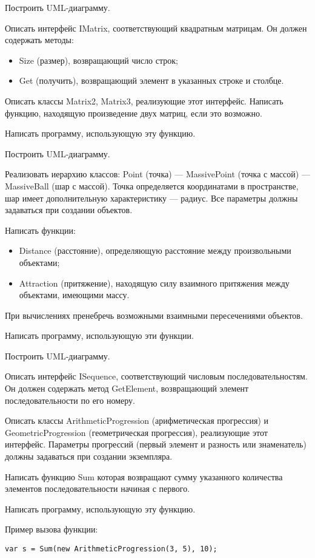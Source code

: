 Построить UML-диаграмму.

\task Описать интерфейс IMatrix, соответствующий квадратным
матрицам. Он должен содержать методы:
\begin{itemize}
\item Size (размер), возвращающий число строк;
\item Get (получить), возвращающий элемент в указанных строке и столбце.
\end{itemize}

Описать классы Matrix2, Matrix3, реализующие этот интерфейс. Написать
функцию, находящую произведение двух матриц, если это возможно.

Написать программу, использующую эту функцию.

Построить UML-диаграмму.

\task Реализовать иерархию классов: Point (точка) — MassivePoint
(точка с массой) — MassiveBall (шар с массой). Точка определяется
координатами в пространстве, шар имеет дополнительную характеристику —
радиус. Все параметры должны задаваться при создании объектов.

Написать функции:
\begin{itemize}
\item Distance (расстояние), определяющую расстояние между
  произвольными объектами;
\item Attraction (притяжение), находящую силу взаимного притяжения
  между объектами, имеющими массу.
\end{itemize}
При вычислениях пренебречь возможными взаимными пересечениями
объектов.

Написать программу, использующую эти функции.

Построить UML-диаграмму.

\task Описать интерфейс ISequence, соответствующий числовым
последовательностям. Он должен содержать метод GetElement,
возвращающий элемент последовательности по его номеру.

Описать классы ArithmeticProgression (арифметическая прогрессия) и
GeometricProgression (геометрическая прогрессия), реализующие этот
интерфейс. Параметры прогрессий (первый элемент и разность или
знаменатель) должны задаваться при создании экземпляра.

Написать функцию Sum которая возвращают сумму указанного количества
элементов последовательности начиная с первого.

Написать программу, использующую эту функцию.

Пример вызова функции:
\begin{lstlisting}[numbers=none]
var s = Sum(new ArithmeticProgression(3, 5), 10);
\end{lstlisting}

